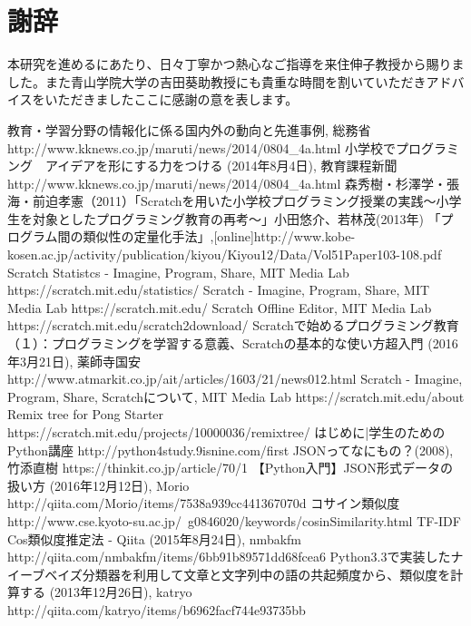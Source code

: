 \documentclass[a4paper,10pt,onecolumn,oneside,openany]{jsbook}
\begin{document}
\chapter{謝辞}
本研究を進めるにあたり、日々丁寧かつ熱心なご指導を来住伸子教授から賜りました。また青山学院大学の吉田葵助教授にも貴重な時間を割いていただきアドバイスをいただきましたここに感謝の意を表します。

\begin{thebibliography}{21}

教育・学習分野の情報化に係る国内外の動向と先進事例, 総務省 http://www.kknews.co.jp/maruti/news/2014/0804\_4a.html
小学校でプログラミング　アイデアを形にする力をつける (2014年8月4日), 教育課程新聞 http://www.kknews.co.jp/maruti/news/2014/0804\_4a.html
森秀樹・杉澤学・張海・前迫孝憲（2011）「Scratchを用いた小学校プログラミング授業の実践〜小学生を対象としたプログラミング教育の再考〜」小田悠介、若林茂(2013年) 「プログラム間の類似性の定量化手法」,[online]http://www.kobe-kosen.ac.jp/activity/publication/kiyou/Kiyou12/Data/Vol51Paper103-108.pdf
Scratch Statistcs - Imagine, Program, Share, MIT Media Lab https://scratch.mit.edu/statistics/
Scratch - Imagine, Program, Share, MIT Media Lab https://scratch.mit.edu/
Scratch Offline Editor, MIT Media Lab https://scratch.mit.edu/scratch2download/
Scratchで始めるプログラミング教育（１）：プログラミングを学習する意義、Scratchの基本的な使い方超入門 (2016年3月21日), 薬師寺国安 http://www.atmarkit.co.jp/ait/articles/1603/21/news012.html
Scratch - Imagine, Program, Share, Scratchについて, MIT Media Lab https://scratch.mit.edu/about
Remix tree for Pong Starter https://scratch.mit.edu/projects/10000036/remixtree/
はじめに|学生のためのPython講座 http://python4study.9isnine.com/first
JSONってなにもの？(2008), 竹添直樹 https://thinkit.co.jp/article/70/1
【Python入門】JSON形式データの扱い方 (2016年12月12日), Morio http://qiita.com/Morio/items/7538a939cc441367070d
 コサイン類似度 http://www.cse.kyoto-su.ac.jp/~g0846020/keywords/cosinSimilarity.html
 TF-IDF Cos類似度推定法 - Qiita (2015年8月24日), nmbakfm http://qiita.com/nmbakfm/items/6bb91b89571dd68fcea6
 Python3.3で実装したナイーブベイズ分類器を利用して文章と文字列中の語の共起頻度から、類似度を計算する (2013年12月26日), katryo http://qiita.com/katryo/items/b6962facf744e93735bb

\end{thebibliography}
\end{document}
